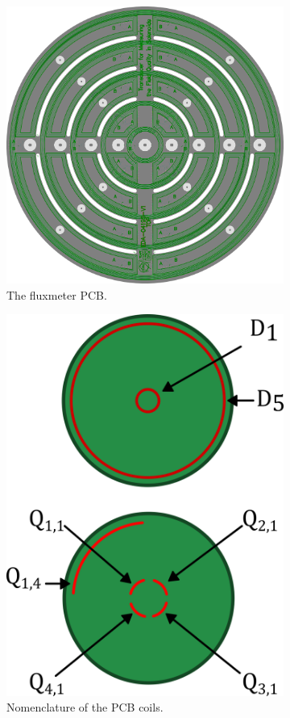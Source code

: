 \begin{figure}[!h]
    \centering
    \begin{subfigure}[b]{0.5\linewidth}
        \centering
        \includegraphics[width=0.8\linewidth]{figs/pcb}
        \caption{The fluxmeter PCB.}
        \label{fig:pcb}
    \end{subfigure}
    \hfill
    \begin{subfigure}[b]{0.4\linewidth}
        \centering
        \includegraphics[width=0.8\linewidth]{figs/nomenclature.png}
        \caption{Nomenclature of the PCB coils.}
        \label{fig:nomenclature}
    \end{subfigure}
    \caption{}
\end{figure}

